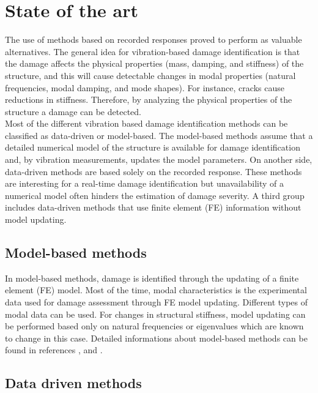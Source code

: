 \documentclass[journal]{IEEEtran}
\begin{document}
\section{State of the art}

The use of methods based on recorded responses proved to perform as valuable alternatives.
The general idea for vibration-based damage identification is that the damage affects the physical properties (mass, damping, and stiffness) of the structure, and this will cause detectable changes in modal properties (natural frequencies, modal damping, and mode shapes).
For instance, cracks cause reductions in stiffness. Therefore, by analyzing the physical properties of the structure a damage can be detected.
\\

Most of the different vibration based damage identification methods can be classified as data-driven or model-based.
 The model-based methods assume that a detailed numerical model of the structure is available for damage identification and, by vibration measurements, updates the model parameters.
 On another side, data-driven methods are based solely on the recorded response. These methods are interesting for a real-time damage identification but unavailability of a numerical model often hinders the estimation of damage severity.
 A third group includes data-driven methods that use finite element (FE) information without model updating.

\subsection{Model-based methods}

In model-based methods, damage is identified through the updating of a finite element (FE) model.
 Most of the time, modal characteristics is the experimental data used for damage assessment through FE model updating.%
Different types of modal data can be used. For changes in structural stiffness, model updating can be performed based only on natural frequencies or eigenvalues which are known to change in this case.
 Detailed informations about model-based methods can be found in references
\cite{fritzen1998damage},
\cite{simoen2015dealing} and
\cite{teughels2005damage}.


\subsection{Data driven methods}
\end{document}
